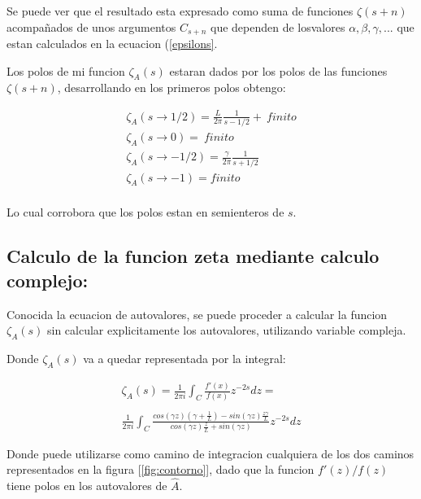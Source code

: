Se puede ver que el resultado esta expresado como suma de funciones $\zeta (s+n)$ acompañados de unos argumentos $C_{s+n}$ que dependen de losvalores $\alpha,\beta,\gamma, ...$ que estan calculados en la ecuacion (\ref{epsilons}.

Los polos de mi funcion $\zeta _A (s)$ estaran dados por los polos de las funciones $\zeta (s+n)$, desarrollando en los primeros polos obtengo:

\begin{equation}
\begin{array}{c}
\zeta _A (s \rightarrow 1/2) = 
\frac{L}{2 \pi } \frac{1}{s-1/2} + \ finito \\
\zeta _A (s \rightarrow 0) = \ finito \\
\zeta _A (s \rightarrow -1/2) = \frac{\gamma}{2 \pi} \frac{1}{s+1/2} \\
\zeta _A (s \rightarrow -1) = finito \\
\end{array}
\end{equation}

Lo cual corrobora que los polos estan en semienteros de $s$.

\subsection{Calculo de la funcion zeta mediante calculo complejo:}

Conocida la ecuacion de autovalores, se puede proceder a calcular la funcion $\zeta _A (s) $ sin calcular explicitamente los autovalores, utilizando variable compleja.

Donde $\zeta _A (s) $ va a quedar representada por la integral:

\begin{equation}
\begin{array}{c}
   \zeta _A (s) =  \frac{1}{2 \pi i} \int _{C} \frac{f'(x)}{f(x)} z ^{-2s} dz = \\ 
   \\ 
    \frac{1}{2 \pi i} \int _{C}
    \frac{ cos(\gamma z) \left(\gamma + \frac{1}{L} \right) - sin(\gamma z) \frac{z \gamma}{L}
    }
    {cos(\gamma z) \frac{z}{L} + sin(\gamma z)
    }
    z ^{-2 s} dz
\end{array}
\end{equation}

Donde puede utilizarse como camino de integracion cualquiera de los dos caminos representados en la figura [\ref{fig:contorno}], dado que la funcion $f'(z) / f(z) $ tiene polos en los autovalores de $\hat{A}$.






